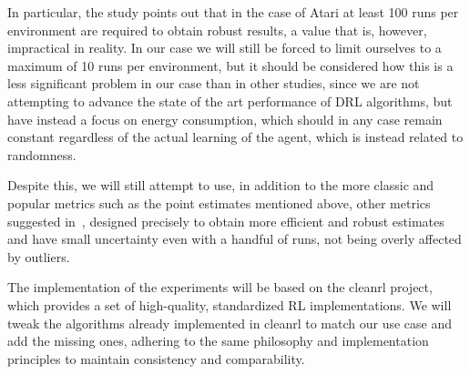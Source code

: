 In particular, the study points out that in the case of Atari at least 100 runs per environment are required to obtain robust results, a value that is, however, impractical in reality. In our case we will still be forced to limit ourselves to a maximum of 10 runs per environment, but it should be considered how this is a less significant problem in our case than in other studies, since we are not attempting to advance the state of the art performance of DRL algorithms, but have instead a focus on energy consumption, which should in any case remain constant regardless of the actual learning of the agent, which is instead related to randomness.

Despite this, we will still attempt to use, in addition to the more classic and popular metrics such as the point estimates mentioned above, other metrics suggested in~\cite{agarwal:statistical_precipice}, designed precisely to obtain more efficient and robust estimates and have small uncertainty even with a handful of runs, not being overly affected by outliers.

The implementation of the experiments will be based on the cleanrl project, which provides a set of high-quality, standardized RL implementations. We will tweak the algorithms already implemented in cleanrl to match our use case and add the missing ones, adhering to the same philosophy and implementation principles to maintain consistency and comparability.

